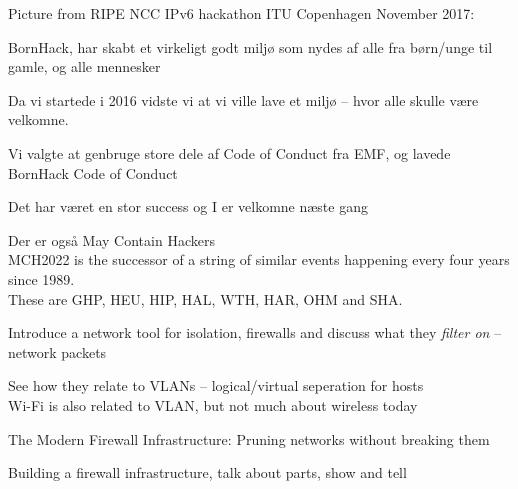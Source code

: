 \documentclass[Screen16to9,17pt]{foils}
\begin{document}


{\color{red}\faHeart} Picture from RIPE NCC IPv6 hackathon ITU Copenhagen November 2017: {\color{red}\faHeart}\\{\footnotesize
{}}



\begin{list2}
\item BornHack, har skabt et virkeligt godt miljø som nydes af alle fra børn/unge til gamle, og alle mennesker
\item Da vi startede i 2016 vidste vi at vi ville lave et miljø -- hvor alle skulle være velkomne.
\item Vi valgte at genbruge store dele af Code of Conduct fra EMF, og lavede BornHack Code of Conduct\\
\item Det har været en stor success og I er velkomne næste gang
\item Der er også May Contain Hackers \\
MCH2022 is the successor of a string of similar events happening every four years since 1989. \\
These are GHP, HEU, HIP, HAL, WTH, HAR, OHM and SHA.

\end{list2}





\begin{list2}
\item Introduce a network tool for isolation, firewalls and discuss what they \emph{filter on} -- network packets
\item See how they relate to VLANs -- logical/virtual seperation for hosts\\
Wi-Fi is also related to VLAN, but not much about wireless today
\item The Modern Firewall Infrastructure: Pruning networks without breaking them
\item Building a firewall infrastructure, talk about parts, show and tell
\end{list2}
\end{document}

